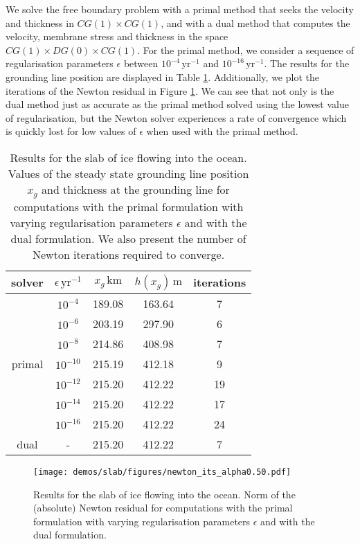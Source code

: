 \documentclass{article}
\theoremstyle{definition}
\theoremstyle{plain}
\begin{document}
We solve the free boundary problem with a primal method that seeks the velocity and thickness in $CG(1)\times CG(1)$, and with a dual method that computes the velocity, membrane stress and thickness in the space $CG(1)\times DG(0)\times CG(1)$. For the primal method, we consider a sequence of regularisation parameters $\epsilon$ between $10^{-4}\, \mathrm{yr}^{-1}$ and $10^{-16}\,\mathrm{yr}^{-1}$. The results for the grounding line position are displayed in Table \ref{tab:slab}. Additionally, we plot the iterations of the Newton residual in Figure \ref{fig:newton-its}. We can see that not only is the dual method just as accurate as the primal method solved using the lowest value of regularisation, but the Newton solver experiences a rate of convergence which is quickly lost for low values of $\epsilon$ when used with the primal method.

\begin{table}[t]
\centering
\caption{Results for the slab of ice flowing into the ocean. Values of the steady state grounding line position $x_g$ and thickness at the grounding line for computations with the primal formulation with varying regularisation parameters $\epsilon$ and with the dual formulation. We also present the number of Newton iterations required to converge.}
\label{tab:slab}
\begin{tabular}{ccccc}
\toprule
solver & $\epsilon\,\mathrm{yr}^{-1}$ & $x_g\,\mathrm{km}$ & $h(x_g)\,\mathrm{m}$ & iterations \\
\midrule
\multirow{7}{*}{primal} & $10^{-4}$ & 189.08 & 163.64 & 7  \\
 & $10^{-6}$ & 203.19 & 297.90 & 6  \\
 & $10^{-8}$ & 214.86 & 408.98 & 7  \\
 & $10^{-10}$ & 215.19 & 412.18 & 9  \\
 & $10^{-12}$ & 215.20 & 412.22 & 19  \\
 & $10^{-14}$ & 215.20 & 412.22 & 17  \\
 & $10^{-16}$ & 215.20 & 412.22 & 24  \\
\midrule
dual & - & 215.20 & 412.22 & 7 \\
\bottomrule
\end{tabular}
\end{table}

\begin{figure}[t]
	\centering
	\texttt{[image: demos/slab/figures/newton\_its\_alpha0.50.pdf]}
	\caption{Results for the slab of ice flowing into the ocean. Norm of the (absolute) Newton residual for computations with the primal formulation with varying regularisation parameters $\epsilon$ and with the dual formulation.}
	\label{fig:newton-its}
\end{figure}
\end{document}
